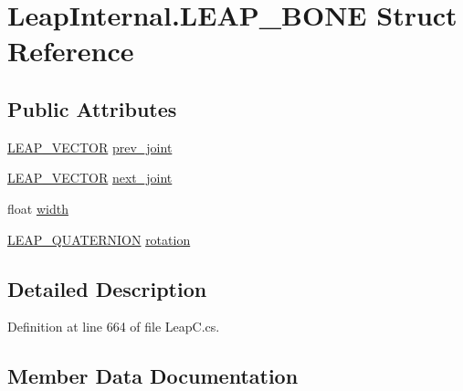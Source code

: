 \hypertarget{struct_leap_internal_1_1_l_e_a_p___b_o_n_e}{}\section{Leap\+Internal.\+L\+E\+A\+P\+\_\+\+B\+O\+NE Struct Reference}
\label{struct_leap_internal_1_1_l_e_a_p___b_o_n_e}
\subsection*{Public Attributes}
\begin{DoxyCompactItemize}
\item 
\mbox{\hyperlink{struct_leap_internal_1_1_l_e_a_p___v_e_c_t_o_r}{L\+E\+A\+P\+\_\+\+V\+E\+C\+T\+OR}} \mbox{\hyperlink{struct_leap_internal_1_1_l_e_a_p___b_o_n_e_aa5b65400a627e83e8ec437f98c0c39dd}{prev\+\_\+joint}}
\item 
\mbox{\hyperlink{struct_leap_internal_1_1_l_e_a_p___v_e_c_t_o_r}{L\+E\+A\+P\+\_\+\+V\+E\+C\+T\+OR}} \mbox{\hyperlink{struct_leap_internal_1_1_l_e_a_p___b_o_n_e_acc36bad15228789aa2001a3376eb6ba5}{next\+\_\+joint}}
\item 
float \mbox{\hyperlink{struct_leap_internal_1_1_l_e_a_p___b_o_n_e_a7ae4bb1717ca1769ee8331b6cacbeec5}{width}}
\item 
\mbox{\hyperlink{struct_leap_internal_1_1_l_e_a_p___q_u_a_t_e_r_n_i_o_n}{L\+E\+A\+P\+\_\+\+Q\+U\+A\+T\+E\+R\+N\+I\+ON}} \mbox{\hyperlink{struct_leap_internal_1_1_l_e_a_p___b_o_n_e_a44b5097714e8033821b8f7917186cbdf}{rotation}}
\end{DoxyCompactItemize}


\subsection{Detailed Description}


Definition at line 664 of file Leap\+C.\+cs.



\subsection{Member Data Documentation}
\mbox{\label{struct_leap_internal_1_1_l_e_a_p___b_o_n_e_acc36bad15228789aa2001a3376eb6ba5}} 
